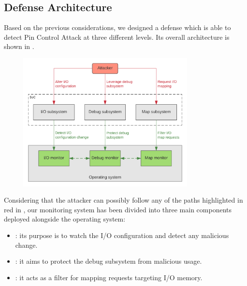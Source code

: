 \subsection{Defense Architecture}
\label{sec:def_arch}

Based on the previous considerations, we designed a defense which is able to detect Pin Control Attack at three different levels.
Its overall architecture is shown in .
\begin{figure}[h]
\centerline{\includegraphics[width=0.8\textwidth]{res/defense}}
\caption{ \label{fig:defense}}
\end{figure}
Considering that the attacker can possibly follow any of the paths highlighted in red in ,
our monitoring system has been divided into three main components deployed alongside the operating system:
\begin{itemize}
	\item {}: its purpose is to watch the I/O configuration and detect any malicious change.
	\item {}: it aims to protect the debug subsystem from malicious usage.
	\item {}: it acts as a filter for mapping requests targeting I/O memory.
\end{itemize}

